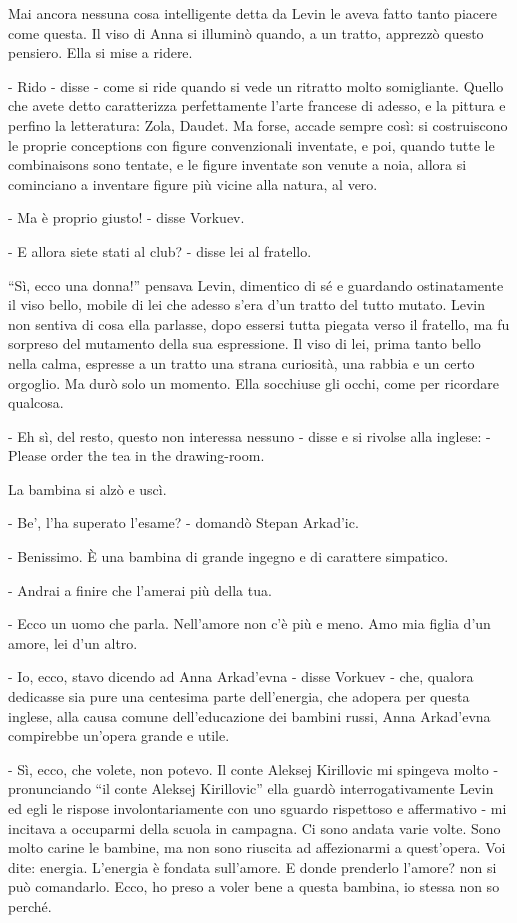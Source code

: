 Mai ancora nessuna cosa intelligente detta da Levin le aveva fatto tanto piacere come questa. Il viso di Anna si illuminò quando, a un tratto, apprezzò questo pensiero. Ella si mise a ridere. 

- Rido - disse - come si ride quando si vede un ritratto molto somigliante. Quello che avete detto caratterizza perfettamente l'arte francese di adesso, e la pittura e perfino la letteratura: Zola, Daudet. Ma forse, accade sempre così: si costruiscono le proprie conceptions con figure convenzionali inventate, e poi, quando tutte le combinaisons sono tentate, e le figure inventate son venute a noia, allora si cominciano a inventare figure più vicine alla natura, al vero. 

- Ma è proprio giusto! - disse Vorkuev. 

- E allora siete stati al club? - disse lei al fratello. 

``Sì, ecco una donna!'' pensava Levin, dimentico di sé e guardando ostinatamente il viso bello, mobile di lei che adesso s'era d'un tratto del tutto mutato. Levin non sentiva di cosa ella parlasse, dopo essersi tutta piegata verso il fratello, ma fu sorpreso del mutamento della sua espressione. Il viso di lei, prima tanto bello nella calma, espresse a un tratto una strana curiosità, una rabbia e un certo orgoglio. Ma durò solo un momento. Ella socchiuse gli occhi, come per ricordare qualcosa. 

- Eh sì, del resto, questo non interessa nessuno - disse e si rivolse alla inglese: - Please order the tea in the drawing-room. 

La bambina si alzò e uscì. 

- Be', l'ha superato l'esame? - domandò Stepan Arkad'ic. 

- Benissimo. È una bambina di grande ingegno e di carattere simpatico. 

- Andrai a finire che l'amerai più della tua. 

- Ecco un uomo che parla. Nell'amore non c'è più e meno. Amo mia figlia d'un amore, lei d'un altro. 

- Io, ecco, stavo dicendo ad Anna Arkad'evna - disse Vorkuev - che, qualora dedicasse sia pure una centesima parte dell'energia, che adopera per questa inglese, alla causa comune dell'educazione dei bambini russi, Anna Arkad'evna compirebbe un'opera grande e utile. 

- Sì, ecco, che volete, non potevo. Il conte Aleksej Kirillovic mi spingeva molto - pronunciando ``il conte Aleksej Kirillovic'' ella guardò interrogativamente Levin ed egli le rispose involontariamente con uno sguardo rispettoso e affermativo - mi incitava a occuparmi della scuola in campagna. Ci sono andata varie volte. Sono molto carine le bambine, ma non sono riuscita ad affezionarmi a quest'opera. Voi dite: energia. L'energia è fondata sull'amore. E donde prenderlo l'amore? non si può comandarlo. Ecco, ho preso a voler bene a questa bambina, io stessa non so perché. 

